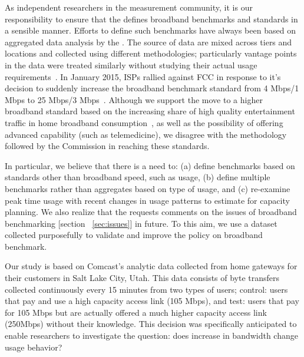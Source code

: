As independent researchers in the measurement community, it is our responsibility to ensure that the
\FCC defines broadband benchmarks and standards in a sensible manner. Efforts to define such
benchmarks have always been based on aggregated data analysis by the \FCC. The source of data are
mixed across tiers and locations and collected using different methodologies; particularly vantage
points in the data were treated similarly without studying their actual usage
requirements~\cite{fcc2015progress-report}.
In January 2015, ISPs rallied against FCC in response to
it’s decision to suddenly increase the broadband benchmark standard from 4 Mbps/1 Mbps to 25 Mbps/3
Mbps~\cite{fcc-redefine-ieee}. Although we support the move to a higher broadband
standard based on the increasing share of high quality entertainment traffic in home broadband
consumption~\cite{sandvine2014report1,sandvine2014report2}, as well as the possibility of offering
advanced capability (such as telemedicine), we disagree with the methodology followed by the
Commission in reaching these standards.

In particular, we believe that there is a need to: (a) define benchmarks based on standards other
than broadband speed, such as usage, (b) define multiple benchmarks rather than aggregates based on
type of usage, and (c) re-examine peak time usage with recent changes in usage patterns to estimate
for capacity planning. We also realize that the \FCC requests comments on the issues of broadband
benchmarking [section ~\ref{sec:issues}] in future. To this aim, we use a dataset collected purposefully to
validate and improve the \FCC policy on broadband benchmark.


Our study is based on Comcast’s analytic data collected from home gateways for their customers in
Salt Lake City, Utah. This data consists of byte transfers collected continuously every 15 minutes
from two types of users; control: users that pay and use a high capacity access link (105 Mbps), and
test: users that pay for 105 Mbps but are actually offered a much higher capacity access link
(250Mbps) without their knowledge. This decision was specifically anticipated to enable researchers
to investigate the question: does increase in bandwidth change usage behavior?

